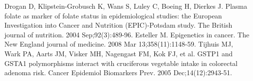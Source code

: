 \begin{thebibliography}{12}
		Drogan D, Klipstein-Grobusch K, Wans S, Luley C, Boeing H, Dierkes J. Plasma folate as marker of folate status in epidemiological studies: the European Investigation into Cancer and Nutrition (EPIC)-Potsdam study. The British journal of nutrition. 2004 Sep;92(3):489-96. 
		Esteller M. Epigenetics in cancer. The New England journal of medicine. 2008 Mar 13;358(11):1148-59. 
		Tijhuis MJ, Wark PA, Aarts JM, Visker MH, Nagengast FM, Kok FJ, et al. GSTP1 and GSTA1 polymorphisms interact with cruciferous vegetable intake in colorectal adenoma risk. Cancer Epidemiol Biomarkers Prev. 2005 Dec;14(12):2943-51. 
\end{thebibliography} 
